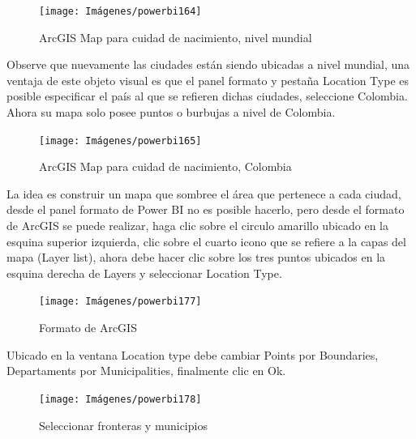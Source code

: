 \documentclass[
]{book}
\begin{document}
\begin{figure}

{\centering \texttt{[image: Imágenes/powerbi164]} 

}

\caption{ArcGIS Map para cuidad de nacimiento, nivel mundial}\label{fig:mapaarcgis-fig}
\end{figure}

Observe que nuevamente las ciudades están siendo ubicadas a nivel mundial, una ventaja de este objeto visual es que el panel formato y pestaña Location Type es posible especificar el país al que se refieren dichas ciudades, seleccione Colombia. Ahora su mapa solo posee puntos o burbujas a nivel de Colombia.

\begin{figure}

{\centering \texttt{[image: Imágenes/powerbi165]} 

}

\caption{ArcGIS Map para cuidad de nacimiento, Colombia}\label{fig:mapaarcgiscolombia-fig}
\end{figure}

La idea es construir un mapa que sombree el área que pertenece a cada ciudad, desde el panel formato de Power BI no es posible hacerlo, pero desde el formato de ArcGIS se puede realizar, haga clic sobre el circulo amarillo ubicado en la esquina superior izquierda, clic sobre el cuarto icono que se refiere a la capas del mapa (Layer list), ahora debe hacer clic sobre los tres puntos ubicados en la esquina derecha de Layers y seleccionar Location Type.

\begin{figure}

{\centering \texttt{[image: Imágenes/powerbi177]} 

}

\caption{Formato de ArcGIS}\label{fig:mapaarcgiscolombiasombrear-fig}
\end{figure}

Ubicado en la ventana Location type debe cambiar Points por Boundaries, Departaments por Municipalities, finalmente clic en Ok.

\begin{figure}

{\centering \texttt{[image: Imágenes/powerbi178]} 

}

\caption{Seleccionar fronteras y municipios}\label{fig:mapaarcgiscolombiasformatomunicipios-fig}
\end{figure}
\end{document}
